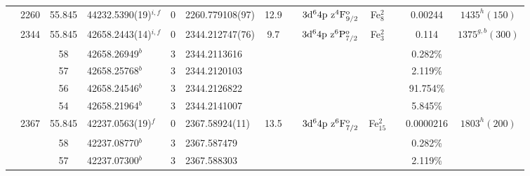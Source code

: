 \begin{table*}
\begin{center}
{\begin{tabular}{:l;l;c;l;c;l;c;l;l;c;c;c;c}
                                  & 2260   & 55.845    & 44232.5390(19)$^{i,f}$           & 0 &   2260.779108(97)  & 12.9 & $                                        $ & $3\rm{d}^64\rm{p~z}^4\rm{F}_{9/2}^{\rm o}$ & Fe$^2_{8}$  &              & 0.00244   & $ 1435^{h}(150)$\\
                                  & 2344   & 55.845    & 42658.2443(14)$^{i,f}$           & 0 &   2344.212747(76)  &  9.7 & $                                        $ & $3\rm{d}^64\rm{p~z}^6\rm{P}_{7/2}^{\rm o}$ & Fe$^2_{3}$  &              & 0.114     & $ 1375^{g,b}(300)$\\
\rowstyle{\itshape}               &        & 58        & 42658.26949$^{b}$                & 3 &  2344.2113616      &      & $                                        $ & $                                        $ &             &              & 0.282\%   & $     ^{}     $\\
\rowstyle{\itshape}               &        & 57        & 42658.25768$^{b}$                & 3 &  2344.2120103      &      & $                                        $ & $                                        $ &             &              & 2.119\%   & $     ^{}     $\\
\rowstyle{\itshape}               &        & 56        & 42658.24546$^{b}$                & 3 &  2344.2126822      &      & $                                        $ & $                                        $ &             &              & 91.754\%  & $     ^{}     $\\
\rowstyle{\itshape}               &        & 54        & 42658.21964$^{b}$                & 3 &  2344.2141007      &      & $                                        $ & $                                        $ &             &              & 5.845\%   & $     ^{}     $\\
                                  & 2367   & 55.845    & 42237.0563(19)$^{f}$             & 0 &    2367.58924(11)  & 13.5 & $                                        $ & $3\rm{d}^64\rm{p~z}^6\rm{F}_{7/2}^{\rm o}$ & Fe$^2_{15}$ &              & 0.0000216 & $ 1803^{h}(200)$\\
\rowstyle{\itshape}               &        & 58        & 42237.08770$^{b}$                & 3 &   2367.587479      &      & $                                        $ & $                                        $ &             &              & 0.282\%   & $     ^{}     $\\
\rowstyle{\itshape}               &        & 57        & 42237.07300$^{b}$                & 3 &   2367.588303      &      & $                                        $ & $                                        $ &             &              & 2.119\%   & $     ^{}     $\\

\end{tabular}}
\end{center}
\end{table*}

